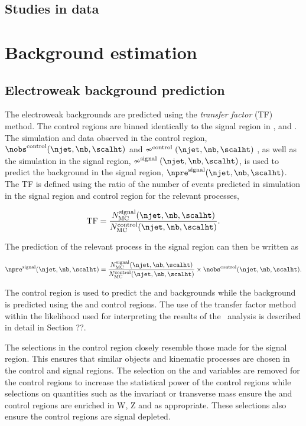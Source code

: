 \subsection{Studies in data}
\section{Background estimation}
\subsection{Electroweak background prediction}
The electroweak backgrounds are predicted using the \emph{transfer factor} (TF)
method. The control regions are binned identically
to the signal region in \scalht, \nj and \nb. The simulation and data observed in the control region,
$\nobs^{\rm control}(\njet,\nb,\scalht)$ and $\nsim^{\rm control}(\njet,\nb,\scalht)$ 
, as well as the simulation in the signal region, $\nsim^{\rm signal}(\njet,\nb,\scalht)$, 
is used to predict the background in the signal region, $\npre^{\rm signal}(\njet,\nb,\scalht)$. 
The TF is defined using the ratio of the number of events predicted in 
simulation in the signal region and control region for the relevant processes,

\begin{equation}
  \label{equ:tf-ratio}
  {\rm TF} = \frac{N_{\rm MC}^{\rm signal}(\njet,\nb,\scalht)}{N_{\rm
      MC}^{\rm control}(\njet,\nb,\scalht)}.
\end{equation}

The prediction of the relevant process in the signal region can then be written as

\begin{equation}
  \label{equ:pred-method}
  \npre^{\rm signal}(\njet,\nb,\scalht) = \frac{N_{\rm MC}^{\rm
      signal}(\njet,\nb,\scalht)}{N_{\rm MC}^{\rm
      control}(\njet,\nb,\scalht)} \times \nobs^{\rm
    control}(\njet,\nb,\scalht).
\end{equation}

The \mj control region is used to predict the \wj and \ttbar backgrounds while the
\znunu background is predicted using the \mmj and \gj control regions. The use of 
the transfer factor method within the likelihood used for interpreting the results of the
\alphat~analysis is described in detail in Section ??.

The selections in the control region closely resemble those made for
the signal region. This ensures that similar objects and kinematic processes
are chosen in the control and signal regions. The selection on the \alphat and
\bdphi variables are removed for the control regions to increase the statistical 
power of the control regions while selections on quantities such as the invariant
or transverse mass ensure the \mj and \mmj control regions are enriched in
W, Z and \ttbar as appropriate. These selections also ensure the control regions
are signal depleted.

